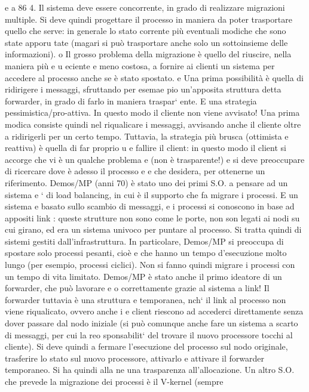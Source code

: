 \documentclass[a4paper,12pt]{article}
\begin{document}
e
a
86
4. Il sistema deve essere concorrente, in grado di realizzare migrazioni multiple.
Si deve quindi progettare il processo in maniera da poter trasportare quello che
serve: in generale lo stato corrente più eventuali modiche che sono state apporu
tate (magari si può trasportare anche solo un sottoinsieme delle informazioni).
o
Il grosso problema della migrazione è quello del riuscire, nella maniera più
e
u
eciente e meno costosa, a fornire ai clienti un sistema per accedere al processo
anche se è stato spostato.
e
Una prima possibilità è quella di ridirigere i messaggi, sfruttando per esemae
pio un'apposita struttura detta forwarder, in grado di farlo in maniera traspar`
ente. E una strategia pessimistica/pro-attiva. In questo modo il cliente non
viene avvisato! Una prima modica consiste quindi nel riqualicare i messaggi,
avvisando anche il cliente oltre a ridirigerli per un certo tempo.
Tuttavia, la strategia più brusca (ottimista e reattiva) è quella di far proprio
u
e
fallire il client: in questo modo il client si accorge che vi è un qualche problema
e
(non è trasparente!) e si deve preoccupare di ricercare dove è adesso il processo
e
e
che desidera, per ottenerne un riferimento.
Demos/MP (anni 70) è stato uno dei primi S.O. a pensare ad un sistema
e
`
di load balancing, in cui è il supporto che fa migrare i processi. E un sistema
e
basato sullo scambio di messaggi, e i processi si conoscono in base ad appositi
link : queste strutture non sono come le porte, non son legati ai nodi su cui
girano, ed era un sistema univoco per puntare al processo. Si tratta quindi di
sistemi gestiti dall'infrastruttura.
In particolare, Demos/MP si preoccupa di spostare solo processi pesanti, cioè
e
che hanno un tempo d'esecuzione molto lungo (per esempio, processi ciclici).
Non si fanno quindi migrare i processi con un tempo di vita limitato.
Demos/MP è stato anche il primo ideatore di un forwarder, che può lavorare
e
o
correttamente grazie al sistema a link! Il forwarder tuttavia è una struttura
e
temporanea, nch` il link al processo non viene riqualicato, ovvero anche i
e
client riescono ad accederci direttamente senza dover passare dal nodo iniziale
(si può comunque anche fare un sistema a scarto di messaggi, per cui la reo
sponsabilit` del trovare il nuovo processore tocchi al cliente). Si deve quindi
a
fermare l'esecuzione del processo sul nodo originale, trasferire lo stato sul nuovo
processore, attivarlo e attivare il forwarder temporaneo. Si ha quindi alla ne
una trasparenza all'allocazione.
Un altro S.O. che prevede la migrazione dei processi è il V-kernel (sempre
\end{document}
